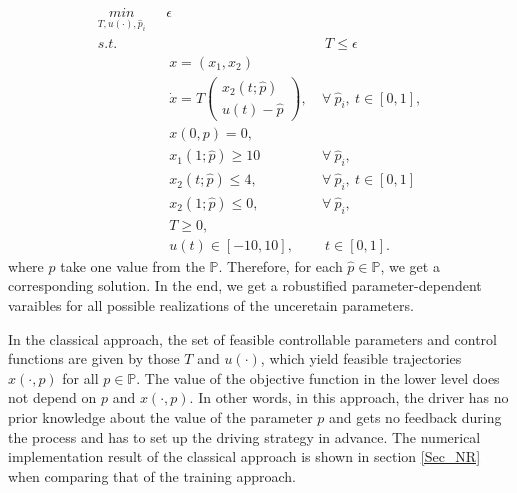 \documentclass  [
  paper    = a4,
  BCOR     = 10mm,
  twoside,
  fontsize = 12pt,
  fleqn,
  toc      = bibnumbered,
  toc      = listofnumbered,
  numbers  = noendperiod,
  headings = normal,
  listof   = leveldown,
  version  = 3.03
]                                       {scrreprt}
\newcommand{\<}{\langle}
\renewcommand{\>}{\rangle}
\begin{document}
\begin{subequations}
	\begin{align}
		\underset{T, u(\cdot), \hat{p}_i}{min}  \ \   & \  \epsilon \\ 
		s.t.  & 	& \ \ T  \leq \epsilon \\
		&  \ \ x = (x_1, x_2)   \label{ca_rc_x} \\ 
		& \ \  \dot{x} = T  \begin{pmatrix}  x_2(t;\hat{p}) \\ u(t)-\hat{p}   \end{pmatrix}, & \ \forall \   \hat{p}_i, \  t \in [0,1],  \label{ca_rc_partial} \\
		& \ \ x(0,p) = 0, \label{ca_rc_t0}\\
		& \ \ x_1(1;\hat{p}) \geq 10   &\ \forall \   \hat{p}_i, \  \label{ca_rc_x1_t1} \\
		& \ \ x_2(t;\hat{p}) \leq 4, &   \ \forall \   \hat{p}_i, \    t \in [0,1] \label{ca_rc_x2_tc} \\
		& \ \ x_2(1;\hat{p}) \leq 0,  &\ \forall \   \hat{p}_i, \  \label{ca_rc_x2_t1}  \\
		& \ \ T \geq 0, \\
		& \ \ u(t) \in [-10, 10], & \ \ t \in [0,1]. 
	\end{align}
	\label{ca_rc}
\end{subequations}
where $\hat{p}$ take one value from the  $\mathbb{P}$. 
Therefore, for each $ \hat{p} \in \mathbb{P}$, we get a corresponding solution. In the end, we get a robustified parameter-dependent varaibles for all possible realizations of the unceretain parameters. 



In the classical approach, the set of feasible controllable parameters and control functions are given by those $T$ and $u(\cdot)$, which yield feasible trajectories $x(\cdot, p)$ for all $p \in \mathbb{P}$. The value of the objective function in the lower level does not depend on $p$ and $x(\cdot, p)$. In other words, in this approach, the driver has no prior knowledge about the value of the parameter $p$ and gets no feedback during the process and has to set up the driving strategy in advance.  The numerical implementation result of the classical approach is shown in section \ref{Sec_NR} when comparing that of the training approach. 
\end{document}
